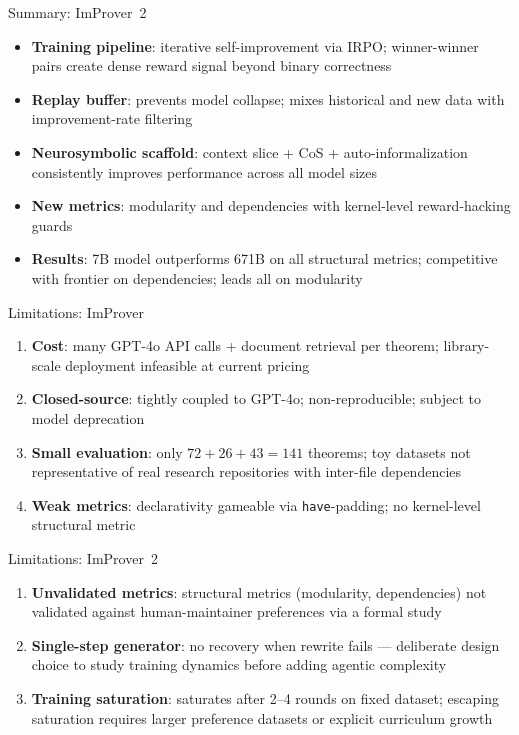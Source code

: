 \documentclass{beamer}
\newcommand{\bad}[1]{\textcolor{improverRed}{\textbf{#1}}}
\begin{document}
\begin{frame}{Summary: ImProver~2}
\vspace{0.3em}
\begin{itemize}\setlength{\itemsep}{5pt}
  \item \textbf{Training pipeline}: iterative self-improvement via IRPO; winner-winner pairs create dense reward signal beyond binary correctness
  \item \textbf{Replay buffer}: prevents model collapse; mixes historical and new data with improvement-rate filtering
  \item \textbf{Neurosymbolic scaffold}: context slice + CoS + auto-informalization consistently improves performance across all model sizes
  \item \textbf{New metrics}: modularity and dependencies with kernel-level reward-hacking guards
  \item \textbf{Results}: 7B model outperforms 671B on all structural metrics; competitive with frontier on dependencies; leads all on modularity
\end{itemize}
\end{frame}

\begin{frame}{Limitations: ImProver}
\vspace{0.8em}
\begin{enumerate}\setlength{\itemsep}{12pt}
  \item[\bad{1.}] \textbf{Cost}: many GPT-4o API calls + document retrieval per theorem; library-scale deployment infeasible at current pricing
  \item[\bad{2.}] \textbf{Closed-source}: tightly coupled to GPT-4o; non-reproducible; subject to model deprecation
  \item[\bad{3.}] \textbf{Small evaluation}: only $72 + 26 + 43 = 141$ theorems; toy datasets not representative of real research repositories with inter-file dependencies
  \item[\bad{4.}] \textbf{Weak metrics}: declarativity gameable via \texttt{have}-padding; no kernel-level structural metric
\end{enumerate}
\end{frame}

\begin{frame}{Limitations: ImProver~2}
\vspace{0.8em}
\begin{enumerate}\setlength{\itemsep}{12pt}
  \item[\bad{1.}] \textbf{Unvalidated metrics}: structural metrics (modularity, dependencies) not validated against human-maintainer preferences via a formal study
  \item[\bad{2.}] \textbf{Single-step generator}: no recovery when rewrite fails --- deliberate design choice to study training dynamics before adding agentic complexity
  \item[\bad{3.}] \textbf{Training saturation}: saturates after 2--4 rounds on fixed dataset; escaping saturation requires larger preference datasets or explicit curriculum growth
\end{enumerate}
\end{frame}
\end{document}
